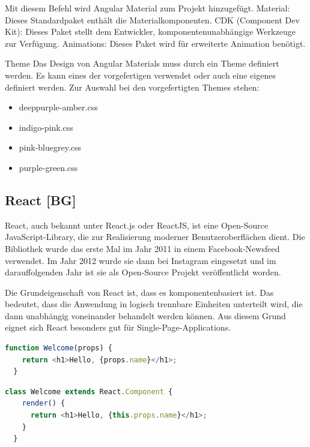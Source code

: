 Mit diesem Befehl wird Angular Material zum Projekt hinzugefügt.
Material: Dieses Standardpaket enthält die Materialkomponenten.
CDK (Component Dev Kit): Dieses Paket stellt dem Entwickler, komponentenunabhängige Werkzeuge zur Verfügung.
Animations:  Dieses Paket wird für erweiterte Animation benötigt.

Theme
Das Design von Angular Materials muss durch ein Theme definiert werden. Es kann eines der vorgefertigen verwendet oder auch eine eigenes definiert werden. Zur Auswahl bei den vorgefertigten Themes stehen:

\begin{itemize}
  \item deeppurple-amber.css
  \item indigo-pink.css
  \item pink-bluegrey.css
  \item purple-green.css
\end{itemize}
\cite{AngularMaterials}

\newpage

\subsection{React [BG]}
React, auch bekannt unter React.js oder ReactJS, ist eine Open-Source JavaScript-Library, die zur Realisierung moderner Benutzeroberflächen dient. Die Bibliothek wurde das erste Mal im Jahr 2011 in einem Facebook-Newsfeed verwendet. Im Jahr 2012 wurde sie dann bei Instagram eingesetzt und im darauffolgenden Jahr ist sie als Open-Source Projekt veröffentlicht worden. 

Die Grundeigenschaft von React ist, dass es komponentenbasiert ist. Das bedeutet, dass die Anwendung in logisch trennbare Einheiten unterteilt wird, die dann unabhängig voneinander behandelt werden können. Aus diesem Grund eignet sich React besonders gut für Single-Page-Applications.
\cite{WasIstReact}

\begin{lstlisting}[language=JavaScript, caption=Möglicher Aufbau einer Komponente in einer JavaScript-Funktion, label=lst:impl:aufbauJSFunction]
  function Welcome(props) {
    return <h1>Hello, {props.name}</h1>;
  }
\end{lstlisting} \cite{WasIstReact}

\begin{lstlisting}[language=JavaScript, caption=Möglicher Aufbau einer Komponente in einer JavaScript-Klasse, label=lst:impl:aufbauJSClass]
  class Welcome extends React.Component {
    render() {
      return <h1>Hello, {this.props.name}</h1>;
    }
  }
\end{lstlisting} \cite{WasIstReact}

